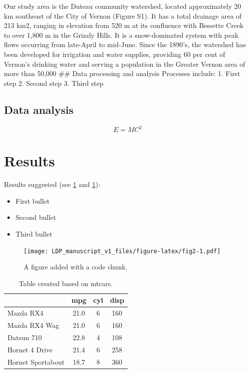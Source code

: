 \documentclass[Water,article,submit,oneauthor]{Definitions/mdpi}
\providecommand{\tightlist}{%
  \setlength{\itemsep}{0pt}\setlength{\parskip}{0pt}}
\begin{document}
Our study area is the Duteau community watershed, located approximately
20 km southeast of the City of Vernon (Figure S1). It has a total
drainage area of 213 km2, ranging in elevation from 520 m at its
confluence with Bessette Creek to over 1,800 m in the Grizzly Hills. It
is a snow-dominated system with peak flows occurring from late-April to
mid-June. Since the 1890's, the watershed has been developed for
irrigation and water supplies, providing 60 per cent of Vernon's
drinking water and serving a population in the Greater Vernon area of
more than 50,000 \#\# Data processing and analysis Processes include: 1.
First step 2. Second step 3. Third step

\hypertarget{data-analysis}{%
\subsection{Data analysis}\label{data-analysis}}

\begin{equation}
E = MC^2
\end{equation}

\hypertarget{results}{%
\section{Results}\label{results}}

Results suggested (see \ref{fig:fig2} and \ref{tab:tab1}):

\begin{itemize}
\tightlist
\item
  First bullet
\item
  Second bullet
\item
  Third bullet
\end{itemize}

\begin{figure}
\centering
\texttt{[image: LDP\_manuscript\_v1\_files/figure-latex/fig2-1.pdf]}
\caption{A figure added with a code chunk.\label{fig:fig2}}
\end{figure}

\begin{table}[H]

\caption{\label{tab:tab1}Table created based on mtcars.}
\begin{tabular}[t]{lccc}
\toprule
  & mpg & cyl & disp\\
\midrule
Mazda RX4 & 21.0 & 6 & 160\\
Mazda RX4 Wag & 21.0 & 6 & 160\\
Datsun 710 & 22.8 & 4 & 108\\
Hornet 4 Drive & 21.4 & 6 & 258\\
Hornet Sportabout & 18.7 & 8 & 360\\
\bottomrule
\end{tabular}
\end{table}
\end{document}
